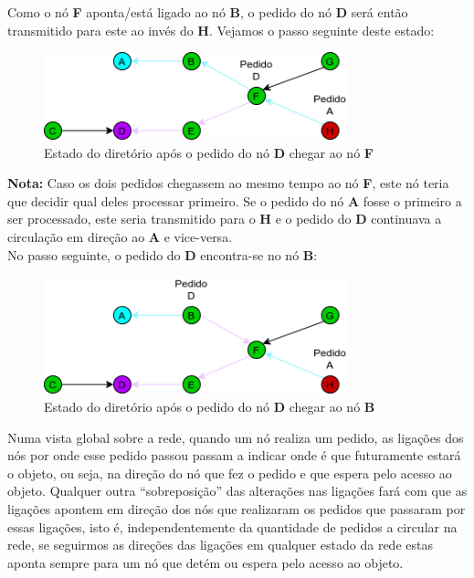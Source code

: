 Como o nó \textbf{F} aponta/está ligado ao nó \textbf{B}, o pedido do nó \textbf{D} será então transmitido para este ao invés do \textbf{H}.
Vejamos o passo seguinte deste estado:


\begin{figure}[!htb]
\centering
\includegraphics[width=250pt]{dois_pedidos_2.png}
\caption{Estado do diretório após o pedido do nó \textbf{D} chegar ao nó \textbf{F}}
\end{figure}

\textbf{Nota:} Caso os dois pedidos chegassem ao mesmo tempo ao nó \textbf{F}, este nó teria que decidir qual deles processar primeiro. Se o pedido do nó \textbf{A} fosse o primeiro a ser processado, este seria transmitido para o \textbf{H} e o pedido do \textbf{D} continuava a circulação em direção ao \textbf{A} e vice-versa. \\

No passo seguinte, o pedido do \textbf{D} encontra-se no nó \textbf{B}:


\begin{figure}[!htb]
\centering
\includegraphics[width=250pt]{dois_pedidos_3.png}
\caption{Estado do diretório após o pedido do nó \textbf{D} chegar ao nó \textbf{B}}
\end{figure}


Numa vista global sobre a rede, quando um nó realiza um pedido, as ligações dos nós por onde esse pedido passou passam a indicar onde é que futuramente estará o objeto, ou seja, na direção do nó que fez o pedido e que espera pelo acesso ao objeto.
Qualquer outra ``sobreposição'' das alterações nas ligações fará com que as ligações apontem em direção dos nós que realizaram os pedidos que passaram por essas ligações, isto é, independentemente da quantidade de pedidos a circular na rede, se seguirmos as direções das ligações em qualquer estado da rede estas aponta sempre para um nó que detém ou espera pelo acesso ao objeto.

